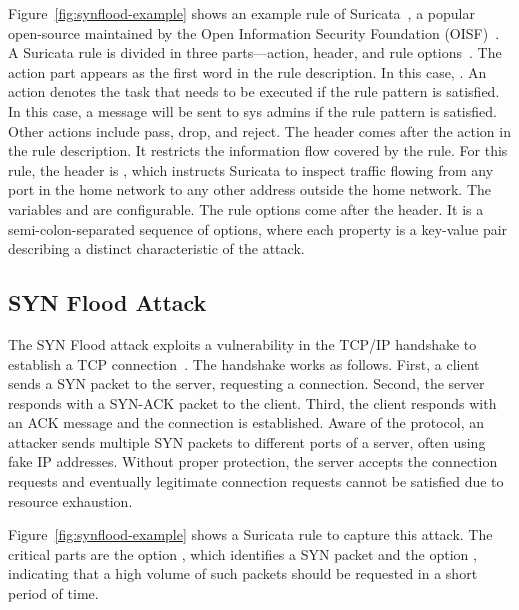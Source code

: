 \documentclass[conference]{IEEEtran}
\begin{document}
Figure~\ref{fig:synflood-example} shows an example rule of
Suricata~\cite{suricata}, a popular open-source \nids{} maintained by
the Open Information Security Foundation (OISF)~\cite{oisf}. A
Suricata rule is divided in three parts---action, header, and rule
options~\cite{suri-rule-format}. The action part appears as the first
word in the rule description. In this case, . An action
denotes the task that needs to be executed if the rule pattern is
satisfied. In this case, a message will be sent to sys admins if the
rule pattern is satisfied. Other actions include pass, drop, and
reject. The header comes after the action in the rule description. It
restricts the information flow covered by the rule. For this rule, the
header is , which
instructs Suricata to inspect  traffic flowing from any
port in the home network to any other address outside the home
network. The variables  and
 are configurable. The rule options come after
the header. It is a semi-colon-separated sequence of options, where
each property is a key-value pair describing a distinct characteristic
of the attack.

\subsection{SYN Flood Attack}

The SYN Flood attack exploits a vulnerability in the TCP/IP handshake
to establish a TCP connection~\cite{cloudfare-synflood}. The handshake
works as follows. First, a client sends a SYN packet to the server,
requesting a connection. Second, the server responds with a SYN-ACK
packet to the client. Third, the client responds with an ACK message
and the connection is established. Aware of the protocol, an attacker
sends multiple SYN packets to different ports of a server, often using
fake IP addresses. Without proper protection, the server accepts the
connection requests and eventually legitimate connection requests
cannot be satisfied due to resource exhaustion.

Figure~\ref{fig:synflood-example} shows a Suricata rule to capture
this attack. The critical parts are the option ,
which identifies a SYN packet and the option , indicating that a high
volume of such packets should be requested in a short period of
time.
\end{document}
